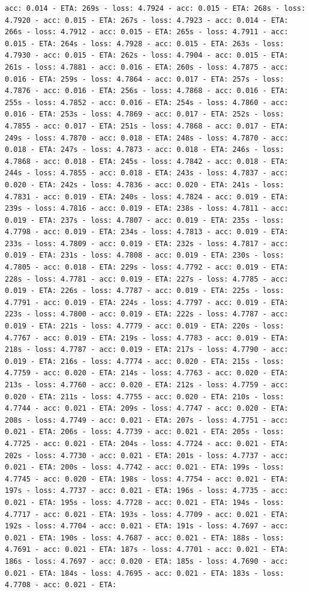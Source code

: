\documentclass[11pt]{article}
\begin{document}
\begin{Verbatim}[commandchars=\\\{\}]
acc: 0.014 - ETA: 269s - loss: 4.7924 - acc: 0.015 - ETA: 268s - loss: 4.7920 - acc: 0.015 - ETA: 267s - loss: 4.7923 - acc: 0.014 - ETA: 266s - loss: 4.7912 - acc: 0.015 - ETA: 265s - loss: 4.7911 - acc: 0.015 - ETA: 264s - loss: 4.7928 - acc: 0.015 - ETA: 263s - loss: 4.7930 - acc: 0.015 - ETA: 262s - loss: 4.7904 - acc: 0.015 - ETA: 261s - loss: 4.7881 - acc: 0.016 - ETA: 260s - loss: 4.7875 - acc: 0.016 - ETA: 259s - loss: 4.7864 - acc: 0.017 - ETA: 257s - loss: 4.7876 - acc: 0.016 - ETA: 256s - loss: 4.7868 - acc: 0.016 - ETA: 255s - loss: 4.7852 - acc: 0.016 - ETA: 254s - loss: 4.7860 - acc: 0.016 - ETA: 253s - loss: 4.7869 - acc: 0.017 - ETA: 252s - loss: 4.7855 - acc: 0.017 - ETA: 251s - loss: 4.7868 - acc: 0.017 - ETA: 249s - loss: 4.7870 - acc: 0.018 - ETA: 248s - loss: 4.7870 - acc: 0.018 - ETA: 247s - loss: 4.7873 - acc: 0.018 - ETA: 246s - loss: 4.7868 - acc: 0.018 - ETA: 245s - loss: 4.7842 - acc: 0.018 - ETA: 244s - loss: 4.7855 - acc: 0.018 - ETA: 243s - loss: 4.7837 - acc: 0.020 - ETA: 242s - loss: 4.7836 - acc: 0.020 - ETA: 241s - loss: 4.7831 - acc: 0.019 - ETA: 240s - loss: 4.7824 - acc: 0.019 - ETA: 239s - loss: 4.7816 - acc: 0.019 - ETA: 238s - loss: 4.7811 - acc: 0.019 - ETA: 237s - loss: 4.7807 - acc: 0.019 - ETA: 235s - loss: 4.7798 - acc: 0.019 - ETA: 234s - loss: 4.7813 - acc: 0.019 - ETA: 233s - loss: 4.7809 - acc: 0.019 - ETA: 232s - loss: 4.7817 - acc: 0.019 - ETA: 231s - loss: 4.7808 - acc: 0.019 - ETA: 230s - loss: 4.7805 - acc: 0.018 - ETA: 229s - loss: 4.7792 - acc: 0.019 - ETA: 228s - loss: 4.7781 - acc: 0.019 - ETA: 227s - loss: 4.7785 - acc: 0.019 - ETA: 226s - loss: 4.7787 - acc: 0.019 - ETA: 225s - loss: 4.7791 - acc: 0.019 - ETA: 224s - loss: 4.7797 - acc: 0.019 - ETA: 223s - loss: 4.7800 - acc: 0.019 - ETA: 222s - loss: 4.7787 - acc: 0.019 - ETA: 221s - loss: 4.7779 - acc: 0.019 - ETA: 220s - loss: 4.7767 - acc: 0.019 - ETA: 219s - loss: 4.7783 - acc: 0.019 - ETA: 218s - loss: 4.7787 - acc: 0.019 - ETA: 217s - loss: 4.7790 - acc: 0.019 - ETA: 216s - loss: 4.7774 - acc: 0.020 - ETA: 215s - loss: 4.7759 - acc: 0.020 - ETA: 214s - loss: 4.7763 - acc: 0.020 - ETA: 213s - loss: 4.7760 - acc: 0.020 - ETA: 212s - loss: 4.7759 - acc: 0.020 - ETA: 211s - loss: 4.7755 - acc: 0.020 - ETA: 210s - loss: 4.7744 - acc: 0.021 - ETA: 209s - loss: 4.7747 - acc: 0.020 - ETA: 208s - loss: 4.7749 - acc: 0.021 - ETA: 207s - loss: 4.7751 - acc: 0.021 - ETA: 206s - loss: 4.7739 - acc: 0.021 - ETA: 205s - loss: 4.7725 - acc: 0.021 - ETA: 204s - loss: 4.7724 - acc: 0.021 - ETA: 202s - loss: 4.7730 - acc: 0.021 - ETA: 201s - loss: 4.7737 - acc: 0.021 - ETA: 200s - loss: 4.7742 - acc: 0.021 - ETA: 199s - loss: 4.7745 - acc: 0.020 - ETA: 198s - loss: 4.7754 - acc: 0.021 - ETA: 197s - loss: 4.7737 - acc: 0.021 - ETA: 196s - loss: 4.7735 - acc: 0.021 - ETA: 195s - loss: 4.7728 - acc: 0.021 - ETA: 194s - loss: 4.7717 - acc: 0.021 - ETA: 193s - loss: 4.7709 - acc: 0.021 - ETA: 192s - loss: 4.7704 - acc: 0.021 - ETA: 191s - loss: 4.7697 - acc: 0.021 - ETA: 190s - loss: 4.7687 - acc: 0.021 - ETA: 188s - loss: 4.7691 - acc: 0.021 - ETA: 187s - loss: 4.7701 - acc: 0.021 - ETA: 186s - loss: 4.7697 - acc: 0.020 - ETA: 185s - loss: 4.7690 - acc: 0.021 - ETA: 184s - loss: 4.7695 - acc: 0.021 - ETA: 183s - loss: 4.7708 - acc: 0.021 - ETA: 
\end{Verbatim}
\end{document}

